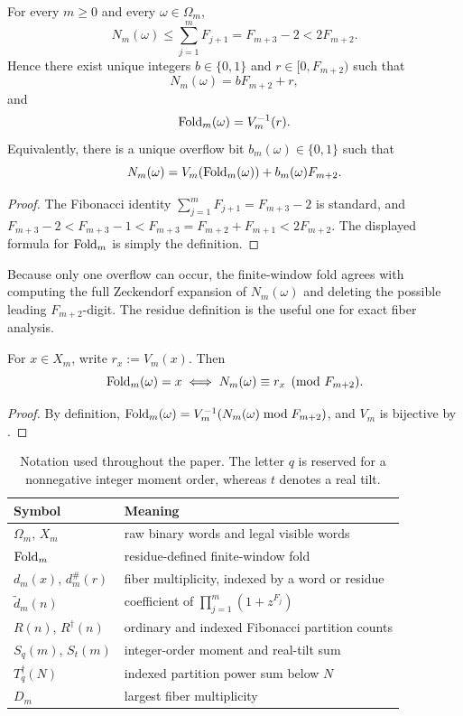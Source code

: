 \begin{proposition}
\label{prop:single-overflow}
For every \(m\ge0\) and every \(\omega\in\Omega_m\),
\[
  N_m(\omega)\le \sum_{j=1}^m F_{j+1}=F_{m+3}-2<2F_{m+2}.
\]
Hence there exist unique integers \(b\in\{0,1\}\) and \(r\in[0,F_{m+2})\) such
that
\[
  N_m(\omega)=bF_{m+2}+r,
\]
and
\[
  \mathrm{Fold}_m(\omega)=V_m^{-1}(r).
\]
Equivalently, there is a unique overflow bit \(b_m(\omega)\in\{0,1\}\) such
that
\[
  N_m(\omega)=V_m(\mathrm{Fold}_m(\omega))+b_m(\omega)F_{m+2}.
\]
\end{proposition}

\begin{proof}
The Fibonacci identity
\(\sum_{j=1}^m F_{j+1}=F_{m+3}-2\) is standard, and
\(F_{m+3}-2<F_{m+3}-1<F_{m+3}=F_{m+2}+F_{m+1}<2F_{m+2}\).  The displayed
formula for \(\mathrm{Fold}_m\) is simply the definition.
\end{proof}

\begin{remark}
\label{rem:prefix-normalization}
Because only one overflow can occur, the finite-window fold agrees with
computing the full Zeckendorf expansion of \(N_m(\omega)\) and deleting the
possible leading \(F_{m+2}\)-digit.
The residue definition is the useful one for exact fiber analysis.
\end{remark}

\begin{corollary}
\label{cor:residue-characterization}
For \(x\in X_m\), write \(r_x:=V_m(x)\).  Then
\[
  \mathrm{Fold}_m(\omega)=x
  \iff
  N_m(\omega)\equiv r_x \pmod{F_{m+2}}.
\]
\end{corollary}

\begin{proof}
By definition,
\(\mathrm{Fold}_m(\omega)=V_m^{-1}(N_m(\omega)\bmod F_{m+2})\), and \(V_m\) is
bijective by .
\end{proof}

\begin{table}[ht]
\centering
\caption{Notation used throughout the paper.  The letter \(q\) is reserved
for a nonnegative integer moment order, whereas \(t\) denotes a real tilt.}
\label{tab:notation}
\begin{tabular}{@{}ll@{}}
\toprule
Symbol & Meaning \\
\midrule
\(\Omega_m\), \(X_m\) & raw binary words and legal visible words \\
\(\mathrm{Fold}_m\) & residue-defined finite-window fold \\
\(d_m(x)\), \(d_m^\#(r)\) & fiber multiplicity, indexed by a word or residue \\
\(\widetilde d_m(n)\) & coefficient of \(\prod_{j=1}^m(1+z^{F_j})\) \\
\(R(n)\), \(R^\dagger(n)\) & ordinary and indexed Fibonacci partition counts \\
\(S_q(m)\), \(S_t(m)\) & integer-order moment and real-tilt sum \\
\(T_q^\dagger(N)\) & indexed partition power sum below \(N\) \\
\(D_m\) & largest fiber multiplicity \\
\bottomrule
\end{tabular}
\end{table}
